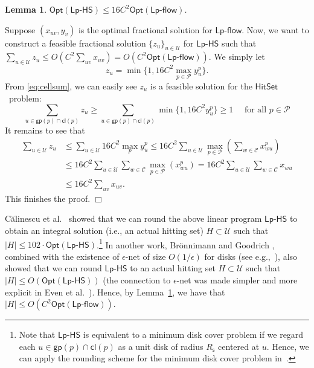 \documentclass[11pt]{article}
\newcommand{\calC}{{\mathcal C}}
\newcommand{\calP}{{\mathcal P}}
\newcommand{\calU}{{\mathcal U}}
\newcommand{\opt}{\mathsf{Opt}}
\newcommand{\rednote}[1]{#1}
\newcommand{\hittingset}{$\mathsf{HitSet}$}
\newcommand{\lpflow}{\mathsf{Lp}\text{-}\mathsf{flow}}
\newcommand{\lphittingset}{\mathsf{Lp}\text{-}\mathsf{HS}}
\newcommand{\group}{\mathsf{gp}}
\newcommand{\cell}{\mathsf{cl}}
\newcommand{\Rs}{R_\mathsf{s}}
\newenvironment{proof}{\noindent {\em Proof: }\ignorespaces}{}
\newcommand{\qed}{\hspace*{\fill}$\Box$\medskip}
\newtheorem{lemma}{Lemma}
\begin{document}
\begin{lemma}
	\label{lm:hittingset}
	$\opt(\lphittingset)\leq 16C^2 \opt(\lpflow)$.
\end{lemma}
\begin{proof}
	Suppose $(x_{uv}, y_v)$ is the optimal fractional solution for $\lpflow$.
	Now, we want to construct a feasible fractional solution $\{z_u\}_{u\in \calU}$ for $\lphittingset$
	such that $\sum_{u\in \calU} z_u\leq O(C^2 \sum_{uv}x_{uv})=O(C^2\opt(\lpflow))$.
	We simply let
	$$
	z_u=\min\{1, 16C^2  \max_{p\in \calP} y^p_u\}.
	$$
	From \eqref{eq:cellsum}, we can easily see $z_u$ is a feasible solution for the \hittingset\ problem:
	$$
	\sum_{u\in \group(p)\cap \cell(p)}z_u\geq
	\sum_{u\in \group(p)\cap \cell(p)}\min\{1, 16C^2 y^p_u\}\geq
	1                              \quad \text{ for all }p\in \calP
	$$
	It remains to see that
	\begin{align*}
	\sum_{u\in \calU}z_u & \leq \sum_{u\in \calU}16C^2 \max_p y^p_u \leq 16C^2 \sum_{u\in \calU} \max_{p\in \calP} \left(\sum_{w\in \calC} x^p_{wu}\right) \\
	& \leq 16C^2 \sum_{u\in \calU}  \sum_{w\in \calC} \max_{p\in \calP} \left(x^p_{wu}\right)  = 16C^2 \sum_{u\in \calU}  \sum_{w\in \calC} x_{wu} \\
	&\leq 16C^2 \sum_{uv}x_{uv}.
	\end{align*}
	This finishes the proof.
	\qed
\end{proof}




\rednote{C{\u{a}}linescu et al.~\cite{calinescu2004selecting} showed that we can round the above linear program $\lphittingset$ to obtain an integral solution (i.e., an actual hitting set) $H\subset \calU$ such that $|H|\leq 102\cdot \opt(\lphittingset)$.}\footnote{Note that $\lphittingset$ is equivalent to a minimum disk cover problem if we regard each $u\in \group(p)\cap \cell(p)$ as a unit disk of radius $\Rs$ centered at $u$. Hence, we can apply the rounding scheme for the minimum disk cover problem in~\cite{calinescu2004selecting}.}
In another work, Br{\"o}nnimann and Goodrich \cite{bronnimann1995almost},
combined with the existence of $\epsilon$-net of size $O(1/\epsilon)$ for disks (see e.g.,~\cite{pyrga2008new}), also showed that we can round $\lphittingset$
to an actual hitting set
$H\subset \calU$ such that $|H|\leq O(\opt(\lphittingset))$
(the connection to $\epsilon$-net was made simpler and more explicit in Even et al.~\cite{even2005hitting}).
Hence, by Lemma~\ref{lm:hittingset}, 
we have that $|H|\leq O(C^2\opt(\lpflow))$.
\end{document}
